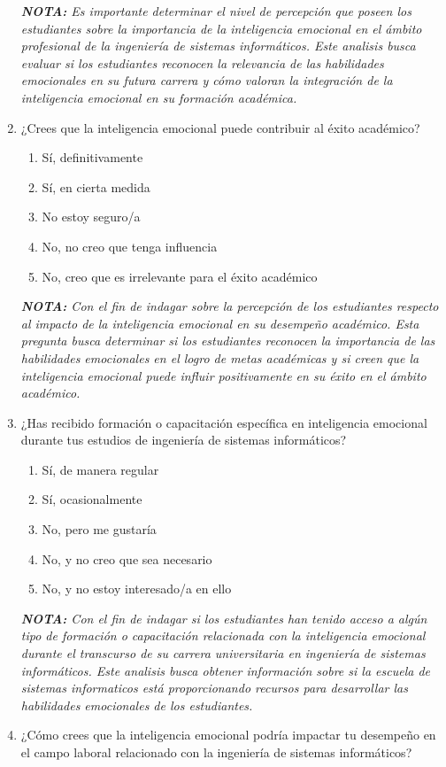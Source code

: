 \documentclass[journal]{IEEEtran}
\begin{document}
\begin{enumerate}
	\textit{\textbf{NOTA:} Es importante determinar el nivel de percepción que poseen los estudiantes sobre la importancia de la inteligencia 			emocional en el ámbito profesional de la ingeniería de sistemas informáticos. Este analisis busca evaluar si los estudiantes reconocen la relevancia de las habilidades emocionales en su futura carrera y cómo valoran la integración de la inteligencia emocional en su formación académica.}
	\item ¿Crees que la inteligencia emocional puede contribuir al éxito académico?
	\begin{enumerate}
		\item Sí, definitivamente
		\item Sí, en cierta medida
		\item No estoy seguro/a
		\item No, no creo que tenga influencia
		\item No, creo que es irrelevante para el éxito académico
	\end{enumerate}
	\textit{\textbf{NOTA:} Con el fin de indagar sobre la percepción de los estudiantes respecto al impacto de la inteligencia emocional en su 			desempeño académico. Esta pregunta busca determinar si los estudiantes reconocen la importancia de las habilidades emocionales en el 			logro de metas académicas y si creen que la inteligencia emocional puede influir positivamente en su éxito en el ámbito académico.}
	\item ¿Has recibido formación o capacitación específica en inteligencia emocional durante tus estudios de ingeniería de sistemas informáticos?
	\begin{enumerate}
		\item Sí, de manera regular
		\item Sí, ocasionalmente
		\item No, pero me gustaría
		\item No, y no creo que sea necesario
		\item No, y no estoy interesado/a en ello
	\end{enumerate}
	\textit{\textbf{NOTA:} Con el fin de indagar si los estudiantes han tenido acceso a algún tipo de formación o capacitación relacionada con la inteligencia emocional durante el transcurso de su carrera universitaria en ingeniería de sistemas informáticos. Este analisis busca obtener información sobre si la escuela de sistemas informaticos está proporcionando recursos para desarrollar las habilidades emocionales de los estudiantes.}
	\item ¿Cómo crees que la inteligencia emocional podría impactar tu desempeño en el campo laboral relacionado con la ingeniería de sistemas informáticos?

\end{enumerate}
\end{document}
